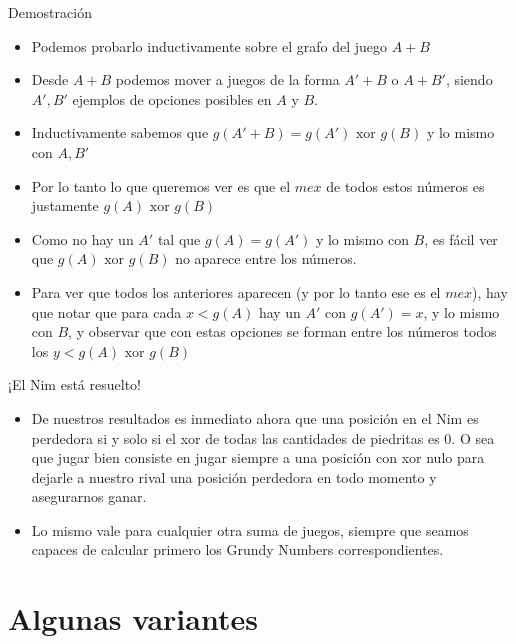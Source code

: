 \documentclass{beamer}
\begin{document}
\begin{frame}{Demostración}
    \begin{itemize}
        \item Podemos probarlo inductivamente sobre el grafo del juego $A+B$
        \item Desde $A+B$ podemos mover a juegos de la forma $A' + B$ o $A + B'$, siendo $A',B'$ ejemplos de opciones
        posibles en $A$ y $B$.
        \item Inductivamente sabemos que $g(A' + B) = g(A') \mbox{\ xor\ } g(B)$ y lo mismo con $A,B'$
        \item Por lo tanto lo que queremos ver es que el $mex$ de todos estos números es justamente $g(A) \mbox{\ xor\ } g(B)$
        \item Como no hay un $A'$ tal que $g(A) = g(A')$ y lo mismo con $B$, es fácil ver que $g(A) \mbox{\ xor\ } g(B)$ no
        aparece entre los números.
        \item Para ver que todos los anteriores aparecen (y por lo tanto ese es el $mex$), hay que notar que para cada $x < g(A)$ hay un $A'$ con $g(A') = x$,
        y lo mismo con $B$, y observar que con estas opciones se forman entre los números todos los $y < g(A) \mbox{\ xor\ } g(B)$
    \end{itemize}
\end{frame}

\begin{frame}{¡El Nim está resuelto!}
    \begin{itemize}
        \item De nuestros resultados es inmediato ahora que una posición en el Nim es perdedora si y solo si el xor de todas las
        cantidades de piedritas es 0. O sea que jugar bien consiste en jugar siempre a una posición con xor nulo para dejarle a
        nuestro rival una posición perdedora en todo momento y asegurarnos ganar.
        \item Lo mismo vale para cualquier otra suma de juegos, siempre que seamos capaces de calcular primero los Grundy Numbers
        correspondientes.
    \end{itemize}
\end{frame}

\section{Algunas variantes}
\end{document}
